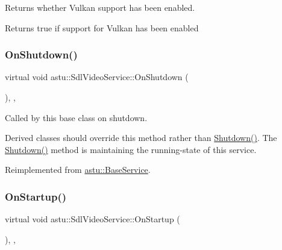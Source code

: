 Returns whether Vulkan support has been enabled.

\begin{DoxyReturn}{Returns}
{\ttfamily true} if support for Vulkan has been enabled 
\end{DoxyReturn}
\mbox{\label{classastu_1_1SdlVideoService_a6d6085e9ff213c5d41546d604ff53e92}} 
\subsubsection{\texorpdfstring{On\+Shutdown()}{OnShutdown()}}
{\footnotesize\ttfamily virtual void astu\+::\+Sdl\+Video\+Service\+::\+On\+Shutdown (\begin{DoxyParamCaption}{ }\end{DoxyParamCaption})\hspace{0.3cm}{\ttfamily [override]}, {\ttfamily [protected]}, {\ttfamily [virtual]}}

Called by this base class on shutdown.

Derived classes should override this method rather than {\ttfamily \hyperlink{classastu_1_1BaseService_a7095888244052db294d58738c0d187fb}{Shutdown()}}. The {\ttfamily \hyperlink{classastu_1_1BaseService_a7095888244052db294d58738c0d187fb}{Shutdown()}} method is maintaining the running-\/state of this service. 

Reimplemented from \hyperlink{classastu_1_1BaseService_aeb5003f7c5efe5412725ac4c66942d03}{astu\+::\+Base\+Service}.

\mbox{\label{classastu_1_1SdlVideoService_add229ac2af59a4aea090e4de4c67e530}} 
\subsubsection{\texorpdfstring{On\+Startup()}{OnStartup()}}
{\footnotesize\ttfamily virtual void astu\+::\+Sdl\+Video\+Service\+::\+On\+Startup (\begin{DoxyParamCaption}{ }\end{DoxyParamCaption})\hspace{0.3cm}{\ttfamily [override]}, {\ttfamily [protected]}, {\ttfamily [virtual]}}

